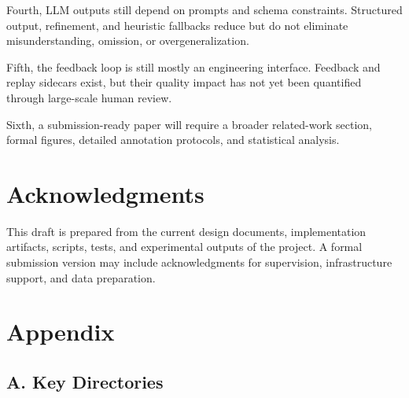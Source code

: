 \documentclass[11pt]{article}
\begin{document}
Fourth, LLM outputs still depend on prompts and schema constraints. Structured output, refinement, and heuristic fallbacks reduce but do not eliminate misunderstanding, omission, or overgeneralization.

Fifth, the feedback loop is still mostly an engineering interface. Feedback and replay sidecars exist, but their quality impact has not yet been quantified through large-scale human review.

Sixth, a submission-ready paper will require a broader related-work section, formal figures, detailed annotation protocols, and statistical analysis.

\section{Acknowledgments}
This draft is prepared from the current design documents, implementation artifacts, scripts, tests, and experimental outputs of the project. A formal submission version may include acknowledgments for supervision, infrastructure support, and data preparation.

\section{Appendix}
\subsection{A. Key Directories}
\end{document}
